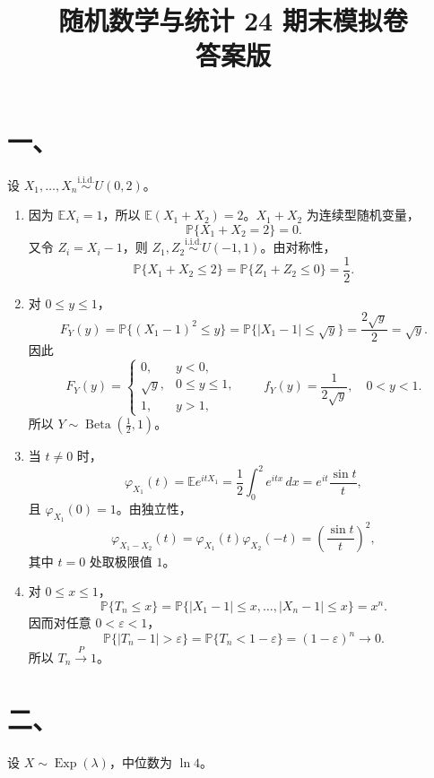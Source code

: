 \documentclass[UTF8,zihao=-4,fontset=windows]{ctexart}
\title{\vspace{-1.2cm}随机数学与统计 24 期末模拟卷\\答案版}
\date{}
\newcommand{\Prob}{\mathbb P}
\newcommand{\EX}{\mathbb E}
\newcommand{\iid}{\overset{\mathrm{i.i.d.}}{\sim}}
\begin{document}
\maketitle
\vspace{-1.5em}

\section*{一、}
设 $X_1,\ldots,X_n \iid U(0,2)$。

\begin{enumerate}
  \item 因为 $\EX X_i=1$，所以 $\EX(X_1+X_2)=2$。$X_1+X_2$ 为连续型随机变量，
  \[
    \Prob\{X_1+X_2=2\}=0.
  \]
  又令 $Z_i=X_i-1$，则 $Z_1,Z_2 \iid U(-1,1)$。由对称性，
  \[
    \Prob\{X_1+X_2\le 2\}
    =\Prob\{Z_1+Z_2\le 0\}
    =\frac12.
  \]

  \item 对 $0\le y\le 1$，
  \[
    F_Y(y)=\Prob\{(X_1-1)^2\le y\}
    =\Prob\{|X_1-1|\le \sqrt y\}
    =\frac{2\sqrt y}{2}
    =\sqrt y.
  \]
  因此
  \[
    F_Y(y)=
    \begin{cases}
      0, & y<0,\\
      \sqrt y, & 0\le y\le 1,\\
      1, & y>1,
    \end{cases}
    \qquad
    f_Y(y)=\frac{1}{2\sqrt y},\quad 0<y<1.
  \]
  所以 $Y\sim \operatorname{Beta}\left(\frac12,1\right)$。

  \item 当 $t\ne 0$ 时，
  \[
    \varphi_{X_1}(t)=\EX e^{itX_1}
    =\frac12\int_0^2 e^{itx}\,dx
    =e^{it}\frac{\sin t}{t},
  \]
  且 $\varphi_{X_1}(0)=1$。由独立性，
  \[
    \varphi_{X_1-X_2}(t)
    =\varphi_{X_1}(t)\varphi_{X_2}(-t)
    =\left(\frac{\sin t}{t}\right)^2,
  \]
  其中 $t=0$ 处取极限值 $1$。

  \item 对 $0\le x\le 1$，
  \[
    \Prob\{T_n\le x\}
    =\Prob\{|X_1-1|\le x,\ldots,|X_n-1|\le x\}
    =x^n.
  \]
  因而对任意 $0<\varepsilon<1$，
  \[
    \Prob\{|T_n-1|>\varepsilon\}
    =\Prob\{T_n<1-\varepsilon\}
    =(1-\varepsilon)^n\to 0.
  \]
  所以 $T_n\xrightarrow{P}1$。
\end{enumerate}

\section*{二、}
设 $X\sim \operatorname{Exp}(\lambda)$，中位数为 $\ln 4$。
\end{document}
